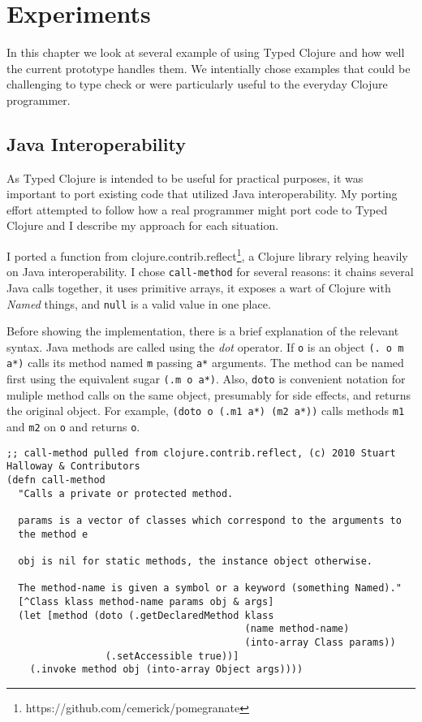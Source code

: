 \chapter{Experiments}

In this chapter we look at several example of using Typed Clojure and
how well the current prototype handles them. 
We intentially chose examples that could be challenging to type check
or were particularly useful to the everyday Clojure programmer.

\section{Java Interoperability}

As Typed Clojure is intended to be useful for practical purposes, it was important
to port existing code that utilized Java interoperability.
My porting effort attempted to follow how a real programmer might port code to Typed Clojure
and I describe my approach for each situation.

I ported a function from clojure.contrib.reflect\footnote{https://github.com/cemerick/pomegranate}, 
a Clojure library relying heavily on Java interoperability.
I chose \lstinline|call-method| for several reasons: it chains several Java calls together,
it uses primitive arrays, it exposes a wart of Clojure with \emph{Named} things,
and \lstinline|null| is a valid value in one place.

Before showing the implementation, there is a brief explanation of the relevant syntax.
Java methods are called using the \emph{dot} operator. If \lstinline|o| is an object \lstinline|(. o m a*)|
calls its method named \lstinline|m| passing \lstinline|a*| arguments. The method can be named first
using the equivalent sugar \lstinline|(.m o a*)|. Also, \lstinline|doto| is convenient 
notation for muliple method calls on the same object, presumably for side effects, and returns the original
object. For example, \lstinline|(doto o (.m1 a*) (m2 a*))| calls methods \lstinline|m1| and \lstinline|m2|
on \lstinline|o| and returns \lstinline|o|.

\begin{lstlisting}[caption=call-method, label=lst:callmethod]
;; call-method pulled from clojure.contrib.reflect, (c) 2010 Stuart Halloway & Contributors
(defn call-method
  "Calls a private or protected method.

  params is a vector of classes which correspond to the arguments to
  the method e

  obj is nil for static methods, the instance object otherwise.

  The method-name is given a symbol or a keyword (something Named)."
  [^Class klass method-name params obj & args]
  (let [method (doto (.getDeclaredMethod klass 
                                         (name method-name)
                                         (into-array Class params))
                 (.setAccessible true))]
    (.invoke method obj (into-array Object args))))
\end{lstlisting}

